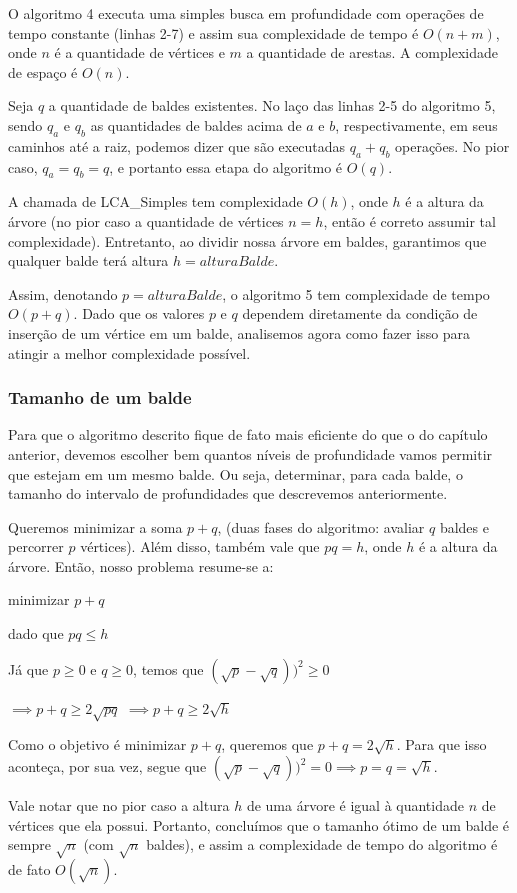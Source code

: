 O algoritmo 4 executa uma simples busca em profundidade com operações de tempo constante (linhas 2-7) e assim sua complexidade de tempo é $O(n+m)$, onde $n$ é a quantidade de vértices e $m$ a quantidade de arestas. A complexidade de espaço é $O(n)$.

Seja $q$ a quantidade de baldes existentes. No laço das linhas 2-5 do algoritmo 5, sendo $q_a$ e $q_b$ as quantidades de baldes acima de $a$ e $b$, respectivamente, em seus caminhos até a raiz, podemos dizer que são executadas $q_a + q_b$ operações. No pior caso, $q_a = q_b = q$, e portanto essa etapa do algoritmo é $O(q)$.

A chamada de LCA\_Simples tem complexidade $O(h)$, onde $h$ é a altura da árvore (no pior caso a quantidade de vértices $n = h$, então é correto assumir tal complexidade). Entretanto, ao dividir nossa árvore em baldes, garantimos que qualquer balde terá altura $h = alturaBalde$.

Assim, denotando $p = alturaBalde$, o algoritmo 5 tem complexidade de tempo $O(p + q)$. Dado que os valores $p$ e $q$ dependem diretamente da condição de inserção de um vértice em um balde, analisemos agora como fazer isso para atingir a melhor complexidade possível.

\vspace{0.8cm}

\subsubsection{Tamanho de um balde}

Para que o algoritmo descrito fique de fato mais eficiente do que o do capítulo anterior, devemos escolher bem quantos níveis de profundidade vamos permitir que estejam em um mesmo balde. Ou seja, determinar, para cada balde, o tamanho do intervalo de profundidades que descrevemos anteriormente.

Queremos minimizar a soma $p + q$, (duas fases do algoritmo: avaliar $q$ baldes e percorrer $p$ vértices). Além disso, também vale que $pq = h$, onde $h$ é a altura da árvore. Então, nosso problema resume-se a:

\centerline{minimizar $p + q$}
\centerline{dado que $pq \leq h$}

\hspace{1cm}

Já que $p \geq 0$ e $q \geq 0$, temos que $(\sqrt{p} - \sqrt{q}))^2 \geq 0$

$\implies p + q \geq 2\sqrt{pq}$
$\implies p + q \geq 2\sqrt{h}$

\hspace{1cm}

Como o objetivo é minimizar $p + q$, queremos que $p + q = 2\sqrt{h}$. Para que isso aconteça, por sua vez, segue que $(\sqrt{p} - \sqrt{q}))^2 = 0 \implies p = q = \sqrt{h}$.

\hspace{1cm}

Vale notar que no pior caso a altura $h$ de uma árvore é igual à quantidade $n$ de vértices que ela possui. Portanto, concluímos que o tamanho ótimo de um balde é sempre $\sqrt{n}$ (com $\sqrt{n}$ baldes), e assim a complexidade de tempo do algoritmo é de fato $O(\sqrt{n})$.

